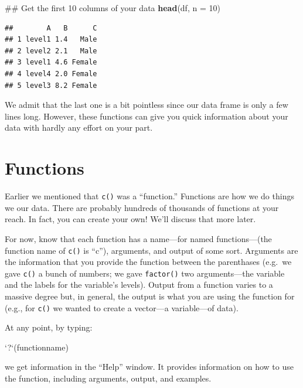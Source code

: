 \documentclass[]{tufte-book}
\newenvironment{Shaded}{}{}
\newcommand{\KeywordTok}[1]{\textcolor[rgb]{0.00,0.44,0.13}{\textbf{#1}}}
\newcommand{\DataTypeTok}[1]{\textcolor[rgb]{0.56,0.13,0.00}{#1}}
\newcommand{\DecValTok}[1]{\textcolor[rgb]{0.25,0.63,0.44}{#1}}
\newcommand{\StringTok}[1]{\textcolor[rgb]{0.25,0.44,0.63}{#1}}
\newcommand{\NormalTok}[1]{#1}
\theoremstyle{definition}
\theoremstyle{definition}
\theoremstyle{remark}
\begin{document}
\begin{Shaded}
\begin{Highlighting}[]
\NormalTok{## Get the first 10 columns of your data}
\KeywordTok{head}\NormalTok{(df, }\DataTypeTok{n =} \DecValTok{10}\NormalTok{)}
\end{Highlighting}
\end{Shaded}

\begin{verbatim}
##        A   B      C
## 1 level1 1.4   Male
## 2 level2 2.1   Male
## 3 level1 4.6 Female
## 4 level4 2.0 Female
## 5 level3 8.2 Female
\end{verbatim}

We admit that the last one is a bit pointless since our data frame is
only a few lines long. However, these functions can give you quick
information about your data with hardly any effort on your part.

\section*{Functions}\label{functions}

Earlier we mentioned that \texttt{c()} was a ``function.'' Functions are
how we do things we our data. There are probably hundreds of thousands
of functions at your reach. In fact, you can create your own! We'll
discuss that more later.

For now, know that each function has a name---for named functions---(the
function name of \texttt{c()} is ``c''), arguments, and output of some
sort. Arguments are the information that you provide the function
between the parenthases (e.g.~we gave \texttt{c()} a bunch of numbers;
we gave \texttt{factor()} two arguments---the variable and the labels
for the variable's levels). Output from a function varies to a massive
degree but, in general, the output is what you are using the function
for (e.g., for \texttt{c()} we wanted to create a vector---a
variable---of data).

At any point, by typing:

\begin{Shaded}
\begin{Highlighting}[]
\StringTok{`}\DataTypeTok{?}\StringTok{`}\NormalTok{(functionname)}
\end{Highlighting}
\end{Shaded}

we get information in the ``Help'' window. It provides information on
how to use the function, including arguments, output, and examples.
\end{document}
